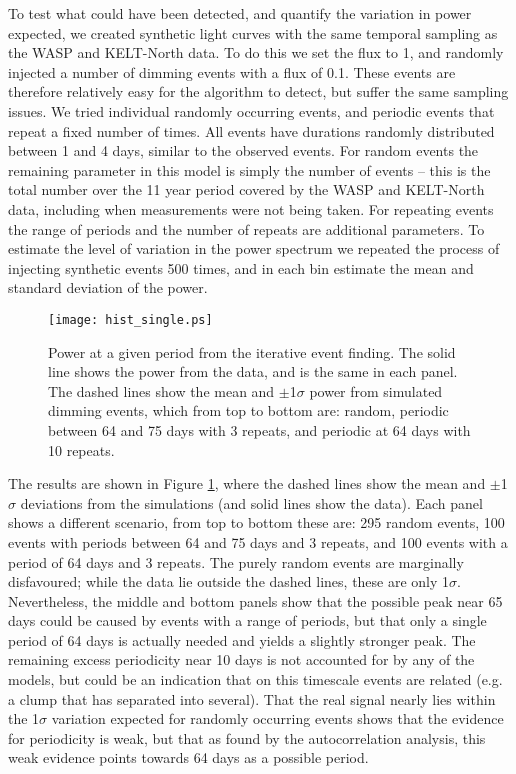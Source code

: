 \documentclass[]{rsos}
\begin{document}
To test what could have been detected, and quantify the variation in power expected,
we created synthetic light curves with the same temporal sampling as the WASP and
KELT-North data. To do this we set the flux to 1, and randomly injected a number of
dimming events with a flux of 0.1. These events are therefore relatively easy for the
algorithm to detect, but suffer the same sampling issues. We tried individual randomly
occurring events, and periodic events that repeat a fixed number of times. All events
have durations randomly distributed between 1 and 4 days, similar to the observed
events. For random events the remaining parameter in this model is simply the number of
events -- this is the total number over the 11 year period covered by the WASP and
KELT-North data, including when measurements were not being taken. For repeating events
the range of periods and the number of repeats are additional parameters. To estimate the
level of variation in the power spectrum we repeated the process of injecting synthetic
events 500 times, and in each bin estimate the mean and standard deviation of the power.

\begin{figure}
  \begin{center}
    \hspace{-0.5cm} \texttt{[image: hist\_single.ps]}
    \caption{Power at a given period from the iterative event finding. The solid line
      shows the power from the data, and is the same in each panel. The dashed lines show
      the mean and $\pm$1$\sigma$ power from simulated dimming events, which from top to
      bottom are: random, periodic between 64 and 75 days with 3 repeats, and periodic at
      64 days with 10 repeats.}\label{fig:hist}
  \end{center}
\end{figure}

The results are shown in Figure \ref{fig:hist}, where the dashed lines show the mean and
$\pm$1$\sigma$ deviations from the simulations (and solid lines show the data). Each
panel shows a different scenario, from top to bottom these are: 295 random events, 100
events with periods between 64 and 75 days and 3 repeats, and 100 events with a period of
64 days and 3 repeats. The purely random events are marginally disfavoured; while the
data lie outside the dashed lines, these are only 1$\sigma$. Nevertheless, the middle and
bottom panels show that the possible peak near 65 days could be caused by events with a
range of periods, but that only a single period of 64 days is actually needed and yields
a slightly stronger peak. The remaining excess periodicity near 10 days is not accounted
for by any of the models, but could be an indication that on this timescale events are
related (e.g. a clump that has separated into several). That the real signal nearly lies
within the 1$\sigma$ variation expected for randomly occurring events shows that the
evidence for periodicity is weak, but that as found by the autocorrelation analysis, this
weak evidence points towards 64 days as a possible period.
\end{document}
